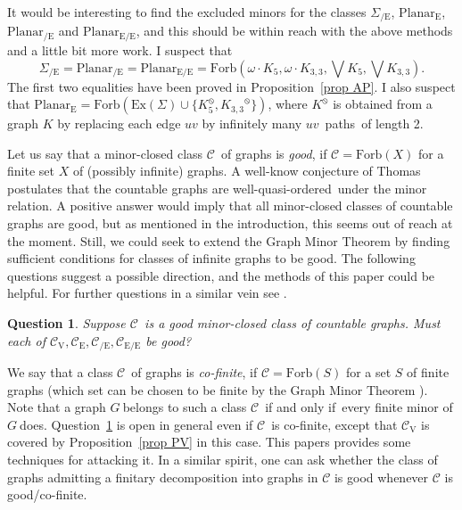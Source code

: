 \documentclass{article}
\newcommand{\forb}[1]{\mathrm{Forb}(#1)}
\newcommand{\ex}[1]{\mathrm{Ex}(#1)}
\newcommand{\prl}[1]{#1^{\obslash}}
\newcommand{\rmv}[1]{\ensuremath{#1_{\mathrm{V}}}}
\newcommand{\rme}[1]{\ensuremath{#1_{\mathrm{E}}}}
\newcommand{\rmce}[1]{\ensuremath{#1_{\mathrm{/E}}}}
\newcommand{\rmece}[1]{\ensuremath{#1_{\mathrm{E/E}}}}
\newcommand{\cof}{co-finite}
\newcommand{\Sig}{\ensuremath{\Sigma}}
\newcommand{\omdot}{\omega \cdot}
\newcommand{\comment}[1]{}
\newcommand{\defi}[1]{{\color{darkgray}\emph{#1}}}
\newtheorem{question}[conjecture]{{Question}}
\newcommand{\cc}{\ensuremath{\mathcal C}}
\newcommand{\pths}[2]{\ensuremath{#1}\text{--}\ensuremath{#2}~paths}
\newcommand{\g}{\ensuremath{G\ }}
\newcommand{\Ktt}{\ensuremath{K_{3,3}}}
\newcommand{\wqo}{well-quasi-ordered}
\newcommand{\Prr}[1]{Pro\-position~\ref{#1}}
\newcommand{\Qr}[1]{Question~\ref{#1}}
\renewcommand{\iff}{if and only if}
\begin{document}
It would be interesting to find the excluded minors for the classes $\rmce{\Sig}$, $\rme{\mathrm{Planar}}$, $\rmce{\mathrm{Planar}}$ and $\rmece{\mathrm{Planar}}$, and this should be within reach with the above methods and a little bit more work. I suspect that $$\rmce{\Sig}= \rmce{\mathrm{Planar}} = \rmece{\mathrm{Planar}} =\forb{\omdot K_5, \omdot \Ktt, \bigvee K_5, \bigvee \Ktt}.$$ The first two equalities have been proved in \Prr{prop AP}. I also suspect that  
$\rme{\mathrm{Planar}}=\forb{ \ex{\Sig} \cup \{\prl{K_5}, \prl{\Ktt} \}}$, where $\prl{K}$ is obtained from a graph $K$ by replacing each edge $uv$ by infinitely many \pths{u}{v}\ of length 2.

\comment{
	\begin{question} \label{Q SigCE}
Is $\rmce{\Sig}=\forb{\omdot K_5, \omdot \Ktt, \bigvee K_5, \bigvee \Ktt}$?
\end{question}
}

\medskip

Let us say that a minor-closed class \cc\ of graphs is \defi{good}, if $\cc=\forb{X}$ for a finite set $X$ of (possibly infinite) graphs. A well-know conjecture of Thomas \cite{ThoWel} postulates that the countable graphs are \wqo\ under the minor relation. A positive answer would imply that all minor-closed classes of countable graphs are good, but as mentioned in the introduction, this seems out of reach at the moment.  Still, we could seek to extend the Graph Minor Theorem \cite{GMXX} by finding sufficient conditions for classes of infinite graphs to be good. The following questions suggest a possible direction, and the methods of this paper  could be helpful. For further questions in a similar vein see \cite{Universal}.


\begin{question} \label{Q good}
Suppose \cc\ is a good minor-closed class of countable graphs. Must each of $\rmv{\cc},\rme{\cc},\rmce{\cc},\rmece{\cc}$ be good?
\end{question}



We say that a class \cc\ of graphs is \defi{\cof}, if $\cc = \forb{S}$ for a set $S$ of finite graphs (which set can be chosen to be finite by the Graph Minor Theorem \cite{GMXX}). Note that a graph \g belongs to such a class \cc\ \iff\ every finite minor of \g does. \Qr{Q good} is open in general even if \cc\ is \cof, except that $\rmv{\cc}$ is covered by \Prr{prop PV} in this case. This papers provides some techniques for attacking it. In a similar spirit, one can ask whether the class of graphs admitting a finitary decomposition into graphs in $\cc$ is good whenever $\cc$ is good/\cof.
\end{document}
